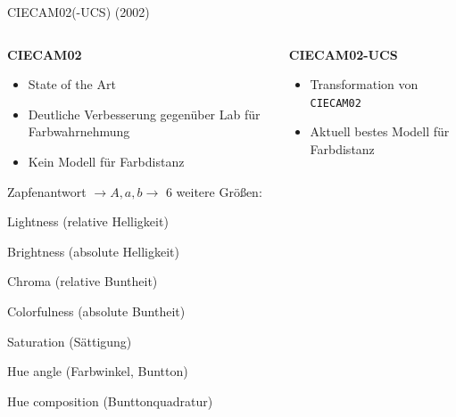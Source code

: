 \documentclass[aspectratio=1610, 9pt]{beamer}
\begin{document}
\begin{frame}[c]{CIECAM02(-UCS) (2002)}
  \begin{columns}[t, onlytextwidth]%
    \begin{column}{0.45\textwidth}%
      \textbf{\Large CIECAM02}

      \begin{itemize}
        \item State of the Art
        \item Deutliche Verbesserung gegenüber Lab für Farbwahrnehmung
        \item Kein Modell für Farbdistanz
      \end{itemize}

      Zapfenantwort ${}→ A, a,b → {}$ 6 weitere Größen:
      \begin{description}[$M$]
        \item[$J$] Lightness (relative Helligkeit)
        \item[$Q$] Brightness (absolute Helligkeit) \\[\baselineskip]
        \item[$C$] Chroma (relative Buntheit)
        \item[$M$] Colorfulness (absolute Buntheit)
        \item[$s$] Saturation (Sättigung) \\[\baselineskip]
        \item[$h$] Hue angle (Farbwinkel, Buntton)
        \item[$H$] Hue composition (Bunttonquadratur)
      \end{description}
    \end{column}
    \begin{column}{0.45\textwidth}%
      \textbf{\Large CIECAM02-UCS}
      \begin{itemize}
        \item Transformation von \texttt{CIECAM02}  
        \item Aktuell bestes Modell für Farbdistanz
      \end{itemize}
    \end{column}
  \end{columns}
\end{frame}
\end{document}
